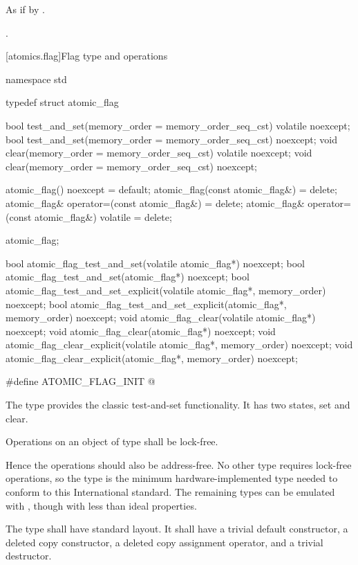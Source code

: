\begin{itemdescr}
\pnum
\effects As if by .

\pnum
\returns {}.
\end{itemdescr}

[atomics.flag]{Flag type and operations}

\begin{codeblock}
namespace std {
  typedef struct atomic_flag {
    bool test_and_set(memory_order = memory_order_seq_cst) volatile noexcept;
    bool test_and_set(memory_order = memory_order_seq_cst) noexcept;
    void clear(memory_order = memory_order_seq_cst) volatile noexcept;
    void clear(memory_order = memory_order_seq_cst) noexcept;

    atomic_flag() noexcept = default;
    atomic_flag(const atomic_flag&) = delete;
    atomic_flag& operator=(const atomic_flag&) = delete;
    atomic_flag& operator=(const atomic_flag&) volatile = delete;
  } atomic_flag;

  bool atomic_flag_test_and_set(volatile atomic_flag*) noexcept;
  bool atomic_flag_test_and_set(atomic_flag*) noexcept;
  bool atomic_flag_test_and_set_explicit(volatile atomic_flag*, memory_order) noexcept;
  bool atomic_flag_test_and_set_explicit(atomic_flag*, memory_order) noexcept;
  void atomic_flag_clear(volatile atomic_flag*) noexcept;
  void atomic_flag_clear(atomic_flag*) noexcept;
  void atomic_flag_clear_explicit(volatile atomic_flag*, memory_order) noexcept;
  void atomic_flag_clear_explicit(atomic_flag*, memory_order) noexcept;

  #define ATOMIC_FLAG_INIT @\seebelow@
}
\end{codeblock}

\pnum
The  type provides the classic test-and-set functionality. It has two states, set and clear.

\pnum
Operations on an object of type  shall be lock-free. \begin{note} Hence
the operations should also be address-free. No other type requires lock-free operations,
so the  type is the minimum hardware-implemented type needed to
conform to this International standard. The remaining types can be emulated with
, though with less than ideal properties. \end{note}

\pnum
The  type shall have standard layout. It shall have a trivial default constructor, a deleted copy constructor, a deleted copy assignment operator, and a trivial destructor.

